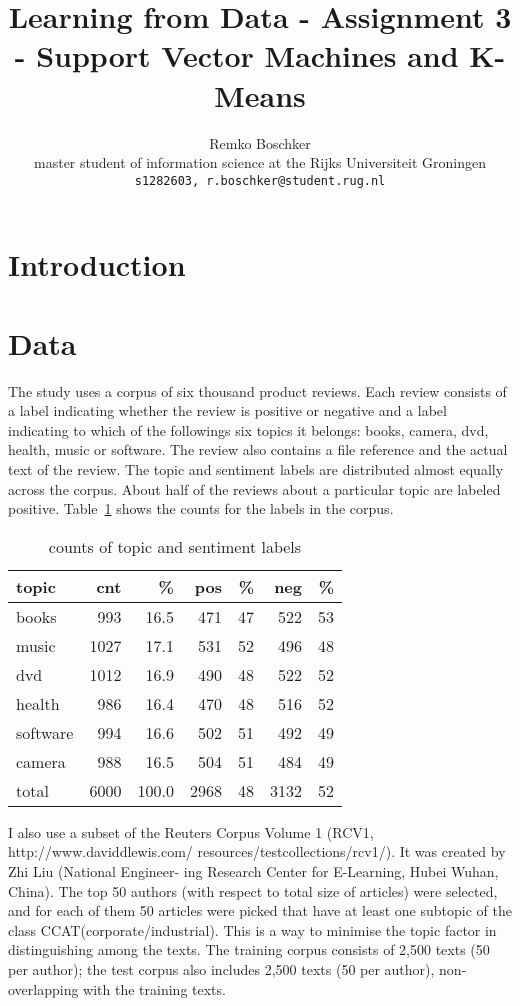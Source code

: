 \documentclass[11pt]{article}
\title{Learning from Data - Assignment 3 - Support Vector Machines and K-Means}
\author{Remko Boschker \\
  master student of information science at the Rijks Universiteit Groningen \\
  {\tt s1282603, r.boschker@student.rug.nl} }
\date{}
\begin{document}
\maketitle
\begin{abstract}

\end{abstract}

\section{Introduction}



\section{Data}

The study uses a corpus of six thousand product reviews. Each review consists of a label indicating whether the review is positive or negative and a label indicating to which of the followings six topics it belongs: books, camera, dvd, health, music or software. The review also contains a file reference and the actual text of the review. The topic and sentiment labels are distributed almost equally across the corpus. About half of the reviews about a particular topic are labeled positive. Table~\ref{tab:corpus} shows the counts for the labels in the corpus.

\begin{table}[ht]\footnotesize
\caption{counts of topic and sentiment labels}
\label{tab:corpus}
\begin{tabular}{ l r r r r r r }
topic & cnt & \% & pos & \% & neg & \% \\
\hline
books & 993 & 16.5 & 471 & 47 & 522 & 53 \\
music & 1027 & 17.1 & 531 & 52 & 496 & 48 \\
dvd & 1012 & 16.9 & 490 & 48 & 522 & 52 \\
health & 986 & 16.4 & 470 & 48 & 516 & 52 \\
software & 994 & 16.6 & 502 & 51 & 492 & 49 \\
camera & 988 & 16.5 & 504 & 51 & 484 & 49 \\
\hline
total & 6000 & 100.0 & 2968 & 48 & 3132 & 52 \\
\end{tabular}

\end{table}

I also use a subset of the Reuters Corpus Volume 1 (RCV1, http://www.daviddlewis.com/ resources/testcollections/rcv1/). It was created by Zhi Liu (National Engineer- ing Research Center for E-Learning, Hubei Wuhan, China). The top 50 authors (with respect to total size of articles) were selected, and for each of them 50 articles were picked that have at least one subtopic of the class CCAT(corporate/industrial). This is a way to minimise the topic factor in distinguishing among the texts. The training corpus consists of 2,500 texts (50 per author); the test corpus also includes 2,500 texts (50 per author), non-overlapping with the training texts.
\end{document}

